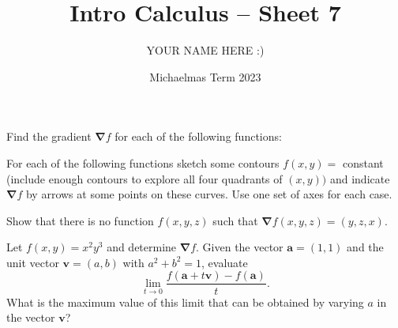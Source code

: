\documentclass[answers]{exam}
\title{Intro Calculus -- Sheet 7}
\author{YOUR NAME HERE :)}
\date{Michaelmas Term 2023}
\def\del{\boldsymbol{\nabla}}
\begin{document}
\maketitle
\begin{questions}

\question%
Find the gradient $\del f$ for each of the following functions:



\question%
For each of the following functions sketch some contours $f(x, y)=$ constant (include enough contours to explore all four quadrants of $(x, y))$ and indicate $\del f$ by arrows at some points on these curves. Use one set of axes for each case. 



\question%
Show that there is no function $f(x, y, z)$ such that $\del f(x, y, z)=(y, z, x)$.



\question%
Let $f(x, y)=x^{2} y^{3}$ and determine $\del f$. Given the vector $\mathbf{a}=(1,1)$ and the unit vector $\mathbf{v}=(a, b)$ with $a^{2}+b^{2}=1$, evaluate \[
	\lim_{t\to0}\frac{f(\mathbf a+t\mathbf v)-f(\mathbf a)}t.
\] What is the maximum value of this limit that can be obtained by varying $a$ in the vector $\mathbf v$?




\end{questions}
\end{document}
